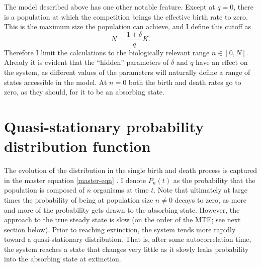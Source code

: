 The model described above has one other notable feature. 
Except at $q=0$, there is a population at which the competition brings the effective birth rate to zero. 
This is the maximum size the population can achieve, and I define this cutoff as
\begin{equation}
N = \frac{1+\delta}{q}K. 
\label{maxN}
\end{equation}
Therefore I limit the calculations to the biologically relevant range $n\in[0,N]$. %
Already it is evident that the ``hidden'' parameters of $\delta$ and $q$ have an effect on the system, as different values of the parameters will naturally define a range of states accessible in the model. 
At $n=0$ both the birth and death rates go to zero, as they should, for it to be an absorbing state. %


\section{Quasi-stationary probability distribution function}%

The evolution of the distribution in the single birth and death process is captured in the master equation \ref{master-eqn} \cite{Nisbet1982,Gardiner2004a}. 
I denote $P_n(t)$ as the probability that the population is composed of $n$ organisms at time $t$.
Note that ultimately at large times the probability of being at population size $n\neq 0$ decays to zero, as more and more of the probability gets drawn to the absorbing state. 
However, the approach to the true steady state is slow (on the order of the MTE; see next section below). 
Prior to reaching extinction, the system tends more rapidly toward a quasi-stationary distribution. 
That is, after some autocorrelation time, the system reaches a state that changes very little as it slowly leaks probability into the absorbing state at extinction. 

